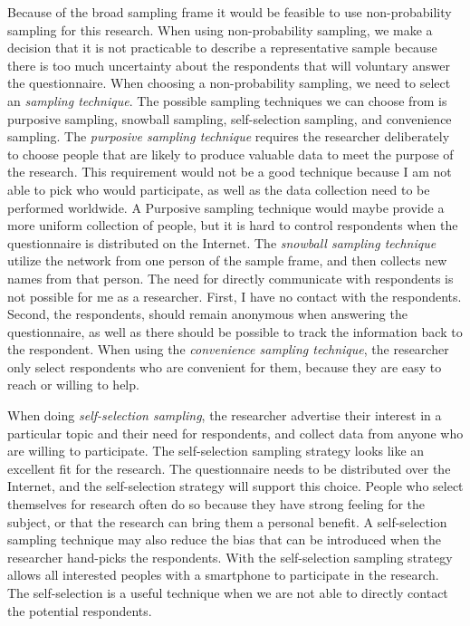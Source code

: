     Because of the broad sampling frame it would be feasible to use non-probability sampling for this research. When using non-probability sampling, we make a decision that it is not practicable to describe a representative sample because there is too much uncertainty about the respondents that will voluntary answer the questionnaire. When choosing a non-probability sampling, we need to select an {\it sampling technique}. The possible sampling techniques we can choose from is purposive sampling, snowball sampling, self-selection sampling, and convenience sampling. The {\it purposive sampling technique} requires the researcher deliberately to choose people that are likely to produce valuable data to meet the purpose of the research. This requirement would not be a good technique because I am not able to pick who would participate, as well as the data collection need to be performed worldwide. A Purposive sampling technique would maybe provide a more uniform collection of people, but it is hard to control respondents when the questionnaire is distributed on the Internet.
    The {\it snowball sampling technique} utilize the network from one person of the sample frame, and then collects new names from that person. The need for directly communicate with respondents is not possible for me as a researcher. {First}, I have no contact with the respondents. {Second}, the respondents, should remain anonymous when answering the questionnaire, as well as there should be possible to track the information back to the respondent.
    When using the {\it convenience sampling technique}, the researcher only select respondents who are convenient for them, because they are easy to reach or willing to help.

    When doing {\it self-selection sampling}, the researcher advertise their interest in a particular topic and their need for respondents, and collect data from anyone who are willing to participate. The self-selection sampling strategy looks like an excellent fit for the research. The questionnaire needs to be distributed over the Internet, and the self-selection strategy will support this choice. People who select themselves for research often do so because they have strong feeling for the subject, or that the research can bring them a personal benefit. A self-selection sampling technique may also reduce the bias that can be introduced when the researcher hand-picks the respondents. With the self-selection sampling strategy allows all interested peoples with a smartphone to participate in the research. The self-selection is a useful technique when we are not able to directly contact the potential respondents.

